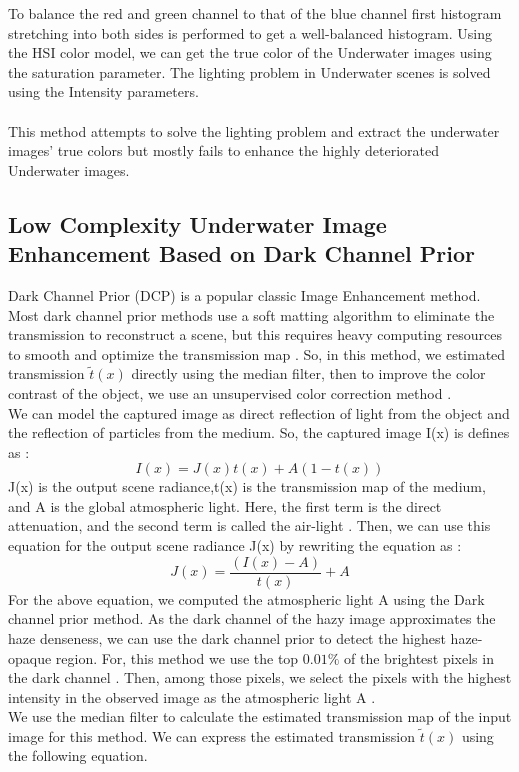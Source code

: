 \documentclass[a4paper,11pt,oneside]{article}
\begin{document}
To balance the red and green channel to that of the blue channel first histogram stretching into both sides is performed to get a well-balanced histogram. Using the HSI color model, we can get the true color of the Underwater images using the saturation parameter. The lighting problem in Underwater scenes is solved using the Intensity parameters. \cite{4} \\
\\
This method attempts to solve the lighting problem and extract the underwater images' true colors but mostly fails to enhance the highly deteriorated Underwater images.

\subsection{Low Complexity Underwater Image Enhancement Based on Dark Channel Prior \cite{8}}
Dark Channel Prior (DCP) is a popular classic Image Enhancement method. Most dark channel prior methods use a soft matting algorithm to eliminate the transmission to reconstruct a scene, but this requires heavy computing resources to smooth and optimize the transmission map \cite{8}. So, in this method, we estimated transmission $\tilde{t}(x)$ directly using the median filter, then to improve the color contrast of the object, we use an unsupervised color correction method \cite{8}.\\
We can model the captured image as direct reflection of light from the object and the reflection of particles from the medium. So, the captured image I(x) is defines as \cite{8}:
$$I(x) = J(x)t(x) + A(1-t(x))$$
J(x) is the output scene radiance,t(x) is the transmission map of the medium, and A is the global atmospheric light. Here, the first term is the direct attenuation, and the second term is called the air-light \cite{8}. Then, we can use this equation for the output scene radiance J(x) by rewriting the equation as \cite{8}:
$$J(x) = \frac{(I(x) - A)}{t(x)} + A$$
For the above equation,  we computed the atmospheric light A using the Dark channel prior method. As the dark channel of the hazy image approximates the haze denseness, we can use the dark channel prior to detect the highest haze-opaque region. For, this method we use the top $0.01\%$ of the brightest pixels in the dark channel \cite{8}. Then, among those pixels, we select the pixels with the highest intensity in the observed image as the atmospheric light A \cite{8}.\\
We use the median filter to calculate the estimated transmission map of the input image for this method. We can express the estimated transmission $\tilde{t}(x)$ using the following equation.
\end{document}
